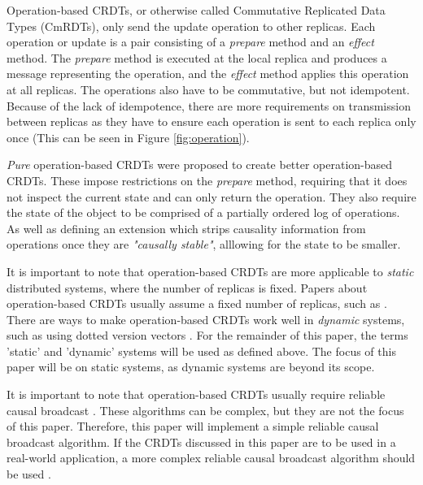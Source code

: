 \documentclass[12pt]{report}
\begin{document}
Operation-based CRDTs, or otherwise called Commutative Replicated Data Types (CmRDTs), only send the update operation to other replicas. Each operation or update is a pair consisting of a \textit{prepare} method and an \textit{effect} method. The \textit{prepare} method is executed at the local replica and produces a message representing the operation, and the \textit{effect} method applies this operation at all replicas\cite{10.1007/978-3-642-24550-3_29}. The operations also have to be commutative, but not idempotent. Because of the lack of idempotence, there are more requirements on transmission between replicas as they have to ensure each operation is sent to each replica only once (This can be seen in Figure \ref{fig:operation}). \par

\textit{Pure} operation-based CRDTs were proposed to create better operation-based CRDTs\cite{10.1007/978-3-662-43352-2_11}. These impose restrictions on the \textit{prepare} method, requiring that it does not inspect the current state and can only return the operation. They also require the state of the object to be comprised of a partially ordered log of operations. As well as defining an extension which strips causality information from operations once they are \textit{"causally stable"}\cite{10.1007/978-3-662-43352-2_11}, alllowing for the state to be smaller.

It is important to note that operation-based CRDTs are more applicable to \textit{static} distributed systems, where the number of replicas is fixed. Papers about operation-based CRDTs usually assume a fixed number of replicas, such as \cite{baquero2017pure}. There are ways to make operation-based CRDTs work well in \textit{dynamic} systems, such as using dotted version vectors \cite{preguiça2010dotted}. For the remainder of this paper, the terms 'static' and 'dynamic' systems will be used as defined above. The focus of this paper will be on static systems, as dynamic systems are beyond its scope.\par 

It is important to note that operation-based CRDTs usually require reliable causal broadcast \cite{10.1007/978-3-662-43352-2_11}. These algorithms can be complex, but they are not the focus of this paper. Therefore, this paper will implement a simple reliable causal broadcast algorithm. If the CRDTs discussed in this paper are to be used in a real-world application, a more complex reliable causal broadcast algorithm should be used \cite{10.1145/128738.128742}. \par
\end{document}
